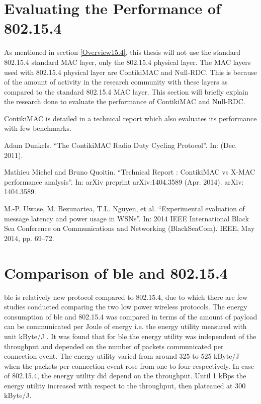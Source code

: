\section{Evaluating the Performance of 802.15.4} \label{4802}

As mentioned in section \ref{Overview15.4}, this thesis will not use the standard 802.15.4 standard MAC layer, only the 802.15.4 physical layer. The MAC layers used with 802.15.4 physical layer are ContikiMAC and Null-RDC. This is because of the amount of activity in the research community with these layers as compared to the standard 802.15.4 MAC layer. This section will briefly explain the research done to evaluate the performance of ContikiMAC and Null-RDC. 

ContikiMAC is detailed in a technical report \cite{Dunkels2011} which also evaluates its performance with few benchmarks.

\cite{Dunkels2011}
Adam Dunkels. “The ContikiMAC Radio Duty Cycling Protocol”. In: (Dec. 2011).

\cite{Michel2014} Mathieu Michel and Bruno Quoitin. “Technical Report : ContikiMAC vs X-MAC performance analysis”. In: arXiv preprint arXiv:1404.3589 (Apr. 2014). arXiv: 1404.3589.

\cite{Uwase2014} M.-P. Uwase, M. Bezunartea, T.L. Nguyen, et al. “Experimental evaluation of message latency and power usage in WSNs”. In: 2014 IEEE International Black Sea Conference on Communications and Networking (BlackSeaCom). IEEE, May 2014,
pp. 69–72.

\section{Comparison of \texorpdfstring{\gls{ble}}{BLE} and 802.15.4} \label{4ble802}

\gls{ble} is relatively new protocol compared to 802.15.4, due to which there are few studies conducted comparing the two low power wireless protocols. The energy consumption of \gls{ble} and 802.15.4 was compared in terms of the amount of payload can be communicated per Joule of energy i.e. the energy utility measured with unit kByte/J \cite{Siekkinen2012}. It was found that for \gls{ble} the energy utility was independent of the throughput and depended on the number of packets communicated per connection event. The energy utility varied from around 325 to 525 kByte/J when the packets per connection event rose from one to four respectively. In case of 802.15.4, the energy utility did depend on the throughput. Until 1 kBps the energy utility increased with respect to the throughput, then plateaued at 300 kByte/J. 

